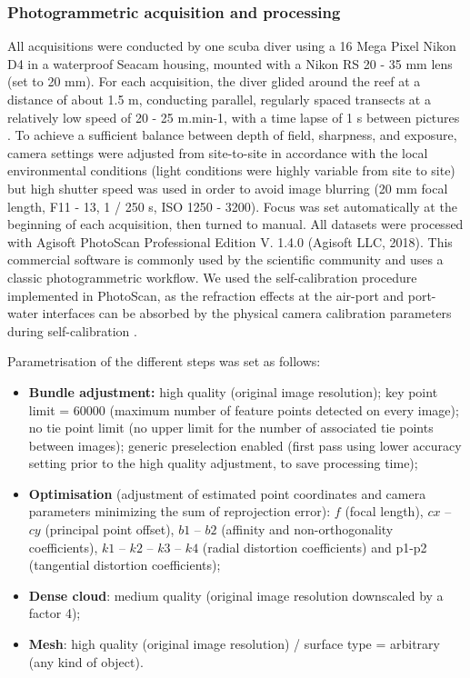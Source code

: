 \subsubsection{Photogrammetric acquisition and processing}\label{chapitre4_2.1.1}
All acquisitions were conducted by one scuba diver using a 16 Mega Pixel Nikon D4 in a waterproof Seacam housing, mounted with a Nikon RS 20 - 35 mm lens (set to 20 mm). For each acquisition, the diver glided around the reef at a distance of about 1.5 m, conducting parallel, regularly spaced transects at a relatively low speed of 20 - 25 m.min-1, with a time lapse of 1 s between pictures \citep{marre_monitoring_2019}. To achieve a sufficient balance between depth of field, sharpness, and exposure, camera settings were adjusted from site-to-site in accordance with the local environmental conditions (light conditions were highly variable from site to site) but high shutter speed was used in order to avoid image blurring (20 mm focal length, F11 - 13, 1 / 250 s, ISO 1250 - 3200). Focus was set automatically at the beginning of each acquisition, then turned to manual.
All datasets were processed with Agisoft PhotoScan Professional Edition V. 1.4.0 (Agisoft LLC, 2018). This commercial software is commonly used by the scientific community \citep{burns_assessing_2016, casella_mapping_2017, figueira_accuracy_2015, guo_accuracy_2016, mizuno_simple_2017} and uses a classic photogrammetric workflow. We used the self-calibration procedure implemented in PhotoScan, as the refraction effects at the air-port and port-water interfaces can be absorbed by the physical camera calibration parameters during self-calibration \citep{shortis_calibration_2015}.

Parametrisation of the different steps was set as follows: 
\begin{itemize}
    \item \textbf{Bundle adjustment:} high quality (original image resolution); key point limit = 60000 (maximum number of feature points detected on every image); no tie point limit (no upper limit for the number of associated tie points between images); generic preselection enabled (first pass using lower accuracy setting prior to the high quality adjustment, to save processing time);
    
    \item \textbf{Optimisation} (adjustment of estimated point coordinates and camera parameters minimizing the sum of reprojection error): $f$ (focal length), $cx$ – $cy$ (principal point offset), $b1$ – $b2$ (affinity and non-orthogonality coefficients), $k1$ – $k2$ – $k3$ – $k4$ (radial distortion coefficients) and p1-p2 (tangential distortion coefficients);
    
    \item \textbf{Dense cloud}: medium quality (original image resolution downscaled by a factor 4);
    
    \item \textbf{Mesh}: high quality (original image resolution) / surface type = arbitrary (any kind of object).
\end{itemize}

